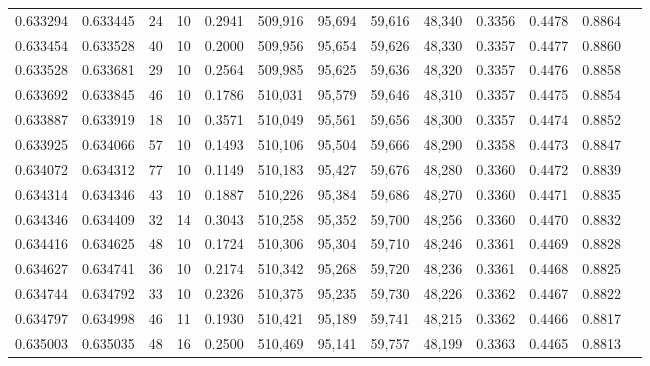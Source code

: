 \begin{tabular}{rrrrrrrrrrrrr}
0.633294 & 0.633445 &    24 &  10 &                                     0.2941 & 509,916 &  95,694 &  59,616 &  48,340 & 0.3356 & 0.4478 & 0.8864 \\
0.633454 & 0.633528 &    40 &  10 &                                     0.2000 & 509,956 &  95,654 &  59,626 &  48,330 & 0.3357 & 0.4477 & 0.8860 \\
0.633528 & 0.633681 &    29 &  10 &                                     0.2564 & 509,985 &  95,625 &  59,636 &  48,320 & 0.3357 & 0.4476 & 0.8858 \\
0.633692 & 0.633845 &    46 &  10 &                                     0.1786 & 510,031 &  95,579 &  59,646 &  48,310 & 0.3357 & 0.4475 & 0.8854 \\
0.633887 & 0.633919 &    18 &  10 &                                     0.3571 & 510,049 &  95,561 &  59,656 &  48,300 & 0.3357 & 0.4474 & 0.8852 \\
0.633925 & 0.634066 &    57 &  10 &                                     0.1493 & 510,106 &  95,504 &  59,666 &  48,290 & 0.3358 & 0.4473 & 0.8847 \\
0.634072 & 0.634312 &    77 &  10 &                                     0.1149 & 510,183 &  95,427 &  59,676 &  48,280 & 0.3360 & 0.4472 & 0.8839 \\
0.634314 & 0.634346 &    43 &  10 &                                     0.1887 & 510,226 &  95,384 &  59,686 &  48,270 & 0.3360 & 0.4471 & 0.8835 \\
0.634346 & 0.634409 &    32 &  14 &                                     0.3043 & 510,258 &  95,352 &  59,700 &  48,256 & 0.3360 & 0.4470 & 0.8832 \\
0.634416 & 0.634625 &    48 &  10 &                                     0.1724 & 510,306 &  95,304 &  59,710 &  48,246 & 0.3361 & 0.4469 & 0.8828 \\
0.634627 & 0.634741 &    36 &  10 &                                     0.2174 & 510,342 &  95,268 &  59,720 &  48,236 & 0.3361 & 0.4468 & 0.8825 \\
0.634744 & 0.634792 &    33 &  10 &                                     0.2326 & 510,375 &  95,235 &  59,730 &  48,226 & 0.3362 & 0.4467 & 0.8822 \\
0.634797 & 0.634998 &    46 &  11 &                                     0.1930 & 510,421 &  95,189 &  59,741 &  48,215 & 0.3362 & 0.4466 & 0.8817 \\
0.635003 & 0.635035 &    48 &  16 &                                     0.2500 & 510,469 &  95,141 &  59,757 &  48,199 & 0.3363 & 0.4465 & 0.8813 \\

\end{tabular}
